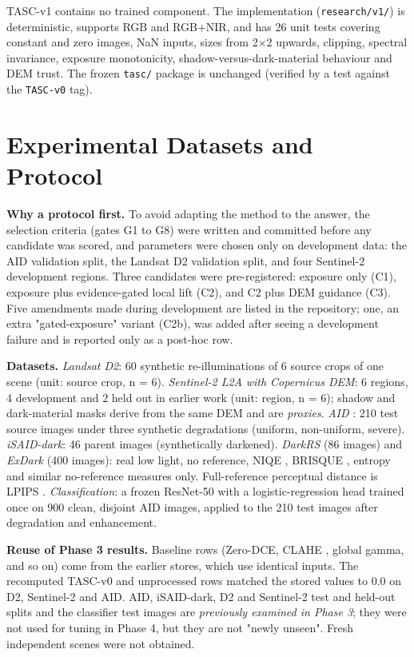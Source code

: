 \documentclass[conference]{IEEEtran}
\begin{document}
TASC-v1 contains no trained component. The implementation (\texttt{research/v1/}) is deterministic, supports RGB and RGB+NIR, and has 26 unit tests covering constant and zero images, NaN inputs, sizes from 2$\times$2 upwards, clipping, spectral invariance, exposure monotonicity, shadow-versus-dark-material behaviour and DEM trust. The frozen \texttt{tasc/} package is unchanged (verified by a test against the \texttt{TASC-v0} tag).

\section{Experimental Datasets and Protocol}
\textbf{Why a protocol first.} To avoid adapting the method to the answer, the selection criteria (gates G1 to G8) were written and committed before any candidate was scored, and parameters were chosen only on development data: the AID validation split, the Landsat D2 validation split, and four Sentinel-2 development regions. Three candidates were pre-registered: exposure only (C1), exposure plus evidence-gated local lift (C2), and C2 plus DEM guidance (C3). Five amendments made during development are listed in the repository; one, an extra "gated-exposure" variant (C2b), was added after seeing a development failure and is reported only as a post-hoc row.

\textbf{Datasets.} \emph{Landsat D2}: 60 synthetic re-illuminations of 6 source crops of one scene (unit: source crop, n = 6). \emph{Sentinel-2 L2A} \cite{drusch2012s2} \emph{with Copernicus DEM}: 6 regions, 4 development and 2 held out in earlier work (unit: region, n = 6); shadow and dark-material masks derive from the same DEM and are \emph{proxies}. \emph{AID} \cite{xia2017aid}: 210 test source images under three synthetic degradations (uniform, non-uniform, severe). \emph{iSAID-dark}: 46 parent images (synthetically darkened). \emph{DarkRS} (86 images) and \emph{ExDark} \cite{loh2019exdark} (400 images): real low light, no reference, NIQE \cite{mittal2013niqe}, BRISQUE \cite{mittal2012brisque}, entropy and similar no-reference measures only. Full-reference perceptual distance is LPIPS \cite{zhang2018lpips}. \emph{Classification}: a frozen ResNet-50 \cite{he2016resnet} with a logistic-regression head trained once on 900 clean, disjoint AID images, applied to the 210 test images after degradation and enhancement.

\textbf{Reuse of Phase 3 results.} Baseline rows (Zero-DCE, CLAHE \cite{zuiderveld1994clahe}, global gamma, and so on) come from the earlier stores, which use identical inputs. The recomputed TASC-v0 and unprocessed rows matched the stored values to $0.0$ on D2, Sentinel-2 and AID. AID, iSAID-dark, D2 and Sentinel-2 test and held-out splits and the classifier test images are \emph{previously examined in Phase 3}; they were not used for tuning in Phase 4, but they are not "newly unseen". Fresh independent scenes were not obtained.
\end{document}
